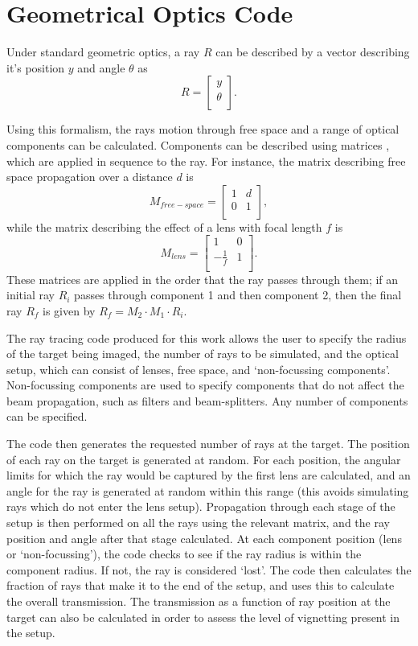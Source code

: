 \section{Geometrical Optics Code} \label{appdx: Ray Tracing}

Under standard geometric optics, a ray $R$ can be described by a vector describing it's position $y$ and angle $\theta$ as 
\[R = 
\begin{bmatrix}
           y \\
           \theta \\
         \end{bmatrix}.
         \]
         
Using this formalism, the rays motion through free space and a range of optical components can be calculated. Components can be described using matrices \cite{Gerrard1975}, which are applied in sequence to the ray. For instance, the matrix describing free space propagation over a distance $d$ is
\[M_{free-space} = 
\begin{bmatrix}
           1 & d \\
           0 & 1 \\
         \end{bmatrix},
         \]
while the matrix describing the effect of a lens with focal length $f$ is 
\[M_{lens} = 
\begin{bmatrix}
           1 & 0 \\
           -\frac{1}{f} & 1 \\
         \end{bmatrix}.
         \]
These matrices are applied in the order that the ray passes through them; if an initial ray $R_i$ passes through component 1 and then component 2, then the final ray $R_f$ is given by $R_f = M_2 \cdot M_{1} \cdot R_i$.

The ray tracing code produced for this work allows the user to specify the radius of the target being imaged, the number of rays to be simulated, and the optical setup, which can consist of lenses, free space, and `non-focussing components'. Non-focussing components are used to specify components that do not affect the beam propagation, such as filters and beam-splitters. Any number of components can be specified. 

The code then generates the requested number of rays at the target. The position of each ray on the target is generated at random. For each position, the angular limits for which the ray would be captured by the first lens are calculated, and an angle for the ray is generated at random within this range (this avoids simulating rays which do not enter the lens setup). Propagation through each stage of the setup is then performed on all the rays using the relevant matrix, and the ray position and angle after that stage calculated. At each component position (lens or `non-focussing'), the code checks to see if the ray radius is within the component radius. If not, the ray is considered `lost'. The code then calculates the fraction of rays that make it to the end of the setup, and uses this to calculate the overall transmission. The transmission as a function of ray position at the target can also be calculated in order to assess the level of vignetting present in the setup.

